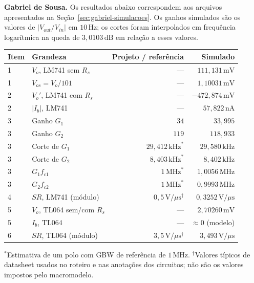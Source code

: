 \documentclass[11pt,a4paper]{article}
\begin{document}
\textbf{Gabriel de Sousa.}
\label{sec:gabriel-resultados}
Os resultados abaixo correspondem aos arquivos apresentados na
Seção~\ref{sec:gabriel-simulacoes}. Os ganhos simulados são os valores de
\(\lvert V_{out}/V_{in}\rvert\) em \(10\,\text{Hz}\); os cortes foram interpolados
em frequência logarítmica na queda de \(3{,}0103\,\text{dB}\) em relação a esses valores.

\begin{center}\small
\setlength{\tabcolsep}{4pt}
\begin{tabular}{@{}llrr@{}}
\toprule
\textbf{Item} & \textbf{Grandeza} & \textbf{Projeto / referência} & \textbf{Simulado} \\
\midrule
1 & \(V_o\), LM741 sem \(R_s\) & — & \(111{,}131\,\text{mV}\) \\
1 & \(V_{os}=V_o/101\) & — & \(1{,}10031\,\text{mV}\) \\
2 & \(V_o'\), LM741 com \(R_s\) & — & \(-472{,}874\,\text{mV}\) \\
2 & \(\lvert I_b\rvert\), LM741 & — & \(57{,}822\,\text{nA}\) \\
3 & Ganho \(G_1\) & \(34\) & \(33{,}995\) \\
3 & Ganho \(G_2\) & \(119\) & \(118{,}933\) \\
3 & Corte de \(G_1\) & \(29{,}412\,\text{kHz}^{*}\) & \(29{,}580\,\text{kHz}\) \\
3 & Corte de \(G_2\) & \(8{,}403\,\text{kHz}^{*}\) & \(8{,}402\,\text{kHz}\) \\
3 & \(G_1f_{c1}\) & \(1\,\text{MHz}^{*}\) & \(1{,}0056\,\text{MHz}\) \\
3 & \(G_2f_{c2}\) & \(1\,\text{MHz}^{*}\) & \(0{,}9993\,\text{MHz}\) \\
4 & \(SR\), LM741 (módulo) & \(0{,}5\,\text{V}/\mu\text{s}^{\dagger}\) & \(0{,}3252\,\text{V}/\mu\text{s}\) \\
5 & \(V_o\), TL064 sem/com \(R_s\) & — & \(2{,}70260\,\text{mV}\) \\
5 & \(I_b\), TL064 & — & \({\approx}0\) (modelo) \\
6 & \(SR\), TL064 (módulo) & \(3{,}5\,\text{V}/\mu\text{s}^{\dagger}\) & \(3{,}493\,\text{V}/\mu\text{s}\) \\
\bottomrule
\end{tabular}
\end{center}
{\small \(^{*}\)Estimativa de um polo com GBW de referência de \(1\,\text{MHz}\).
\(^{\dagger}\)Valores típicos de datasheet usados no roteiro e nas anotações dos circuitos;
não são os valores impostos pelo macromodelo.}
\end{document}
